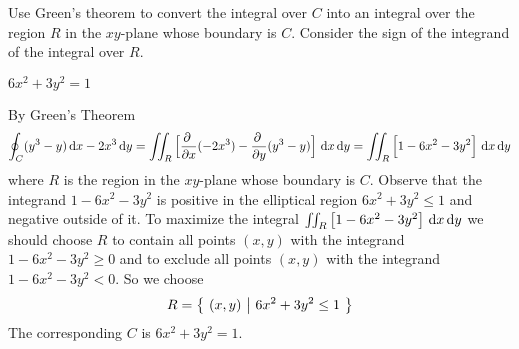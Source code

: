 \begin{hint}
Use Green's theorem to convert the integral over $C$ into an integral 
over the region $R$ in the $xy$-plane whose boundary is $C$. Consider 
the sign of the integrand of the integral over $R$. 
\end{hint}

\begin{answer} 
$6x^2+3y^2= 1$
\end{answer}

\begin{solution} 
By Green's Theorem
\begin{equation*}
\oint_C(y^3-y)\,\dee{x}-2x^3\,\dee{y}
=\dblInt_R\Big[\pdiff{}{x}(-2x^3)
-\pdiff{}{y}(y^3-y)\Big]\ \dee{x}\,\dee{y}
=\dblInt_R\Big[1-6x^2-3y^2\Big]\ \dee{x}\,\dee{y}
\end{equation*}
where $R$ is the region in the $xy$-plane whose boundary is $C$. Observe
that the integrand $1-6x^2-3y^2$ is positive in the elliptical region
 $6x^2+3y^2\le 1$ and negative outside of it. To maximize the integral
$\dblInt_R\big[1-6x^2-3y^2\big]\ \dee{x}\,\dee{y}$ we should choose $R$ to contain
all points $(x,y)$ with the integrand $1-6x^2-3y^2\ge 0$ and to exclude
all points $(x,y)$ with the integrand $1-6x^2-3y^2< 0$. So we
choose 
\begin{equation*}
R=\big\{ \ (x,y)\ \big|\ 6x^2+3y^2\le 1\ \big\}
\end{equation*}
The corresponding $C$ is $6x^2+3y^2= 1$.



\end{solution}


